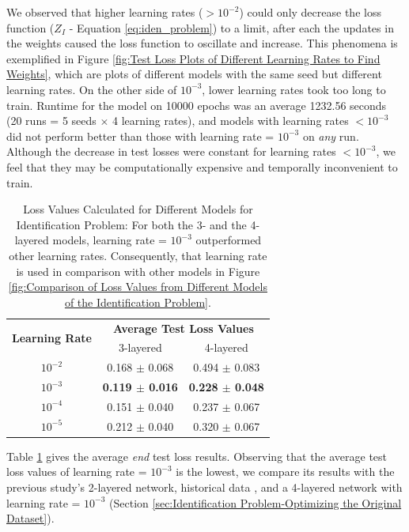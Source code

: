 \documentclass[12pt]{article}
\begin{document}
    We observed that higher learning rates ($>10^{-2}$) could only decrease the loss function ($Z_I$ - Equation \ref{eq:iden_problem}) to a limit, after each the updates in the weights caused the loss function to oscillate and increase. This phenomena is exemplified in Figure \ref{fig:Test Loss Plots of Different Learning Rates to Find Weights}, which are plots of different models with the same seed but different learning rates. On the other side of $10^{-3}$, lower learning rates took too long to train. Runtime for the model on 10000 epochs was an average 1232.56 seconds (20 runs = 5 seeds $\times$ 4 learning rates), and models with learning rates $< 10^{-3}$ did not perform better than those with learning rate = $10^{-3}$ on \textit{any} run. Although the decrease in test losses were constant for learning rates $< 10^{-3}$, we feel that they may be computationally expensive and temporally inconvenient to train.
    \begin{table}[!htbp]
        \centering
        \caption[Loss Values Calculated for Different Models for Identification Problem]{Loss Values Calculated for Different Models for Identification Problem: For both the 3- and the 4-layered models, learning rate = $10^{-3}$ outperformed other learning rates. Consequently, that learning rate is used in comparison with other models in Figure \ref{fig:Comparison of Loss Values from Different Models of the Identification Problem}.}
        \label{tab:Loss Values Calculated for Different Models for Identification Problem}
        \begin{tabular}{c | c | c}
            \hline
            \multirow{2}{*}{\textbf{Learning Rate}} & \multicolumn{2}{c}{\textbf{Average Test Loss Values}} \\
            & 3-layered & 4-layered\\
            \hline
            $10^{-2}$ & 0.168 $\pm$ 0.068 & 0.494 $\pm$ 0.083\\
            $10^{-3}$ & \textbf{0.119 $\pm$ 0.016} & \textbf{0.228 $\pm$ 0.048}\\
            $10^{-4}$ & 0.151 $\pm$ 0.040 & 0.237 $\pm$ 0.067\\
            $10^{-5}$ & 0.212 $\pm$ 0.040 & 0.320 $\pm$ 0.067\\
            \hline
        \end{tabular}
    \end{table}
    
    Table \ref{tab:Loss Values Calculated for Different Models for Identification Problem} gives the average \textit{end} test loss results. Observing that the average test loss values of learning rate = $10^{-3}$ is the lowest, we compare its results with the previous study's 2-layered network, historical data \cite[// todo]{Xue2016Avi2}, and a 4-layered network with learning rate = $10^{-3}$ (Section \ref{sec:Identification Problem-Optimizing the Original Dataset}).
    
\end{document}
